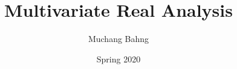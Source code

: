 \documentclass{article}
\begin{document}
\title{Multivariate Real Analysis}
\author{Muchang Bahng}
\date{Spring 2020}

\maketitle
\tableofcontents
\pagebreak






\end{document}
